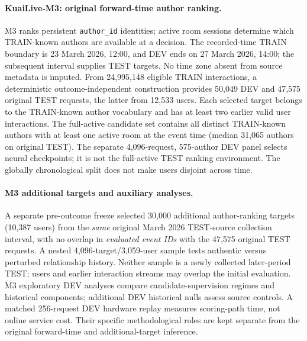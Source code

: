 \paragraph{KuaiLive-M3: original forward-time author ranking.}
M3 ranks persistent \texttt{author\_id} identities; active room sessions determine which TRAIN-known authors are available at a decision. The recorded-time TRAIN boundary is 23 March 2026, 12:00, and DEV ends on 27 March 2026, 14:00; the subsequent interval supplies TEST targets. No time zone absent from source metadata is imputed. From 24,995,148 eligible TRAIN interactions, a deterministic outcome-independent construction provides 50,049 DEV and 47,575 original TEST requests, the latter from 12,533 users. Each selected target belongs to the TRAIN-known author vocabulary and has at least two earlier valid user interactions. The full-active candidate set contains all distinct TRAIN-known authors with at least one active room at the event time (median 31,065 authors on original TEST). The separate 4,096-request, 575-author DEV panel selects neural checkpoints; it is not the full-active TEST ranking environment. The globally chronological split does not make users disjoint across time.

\paragraph{M3 additional targets and auxiliary analyses.}
A separate pre-outcome freeze selected 30,000 additional author-ranking targets (10,387 users) from the \emph{same} original March 2026 TEST-source collection interval, with no overlap in \emph{evaluated event IDs} with the 47,575 original TEST requests. A nested 4,096-target/3,059-user sample tests authentic versus perturbed relationship history. Neither sample is a newly collected later-period TEST; users and earlier interaction streams may overlap the initial evaluation. M3 exploratory DEV analyses compare candidate-supervision regimes and historical components; additional DEV historical nulls assess source controls. A matched 256-request DEV hardware replay measures scoring-path time, not online service cost. Their specific methodological roles are kept separate from the original forward-time and additional-target inference.

